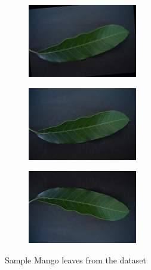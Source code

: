 \documentclass[twocolumn]{article}
\begin{document}
\begin{figure}[H]
    \begin{subfigure}[b]{0.30\columnwidth}
        \includegraphics[width=\textwidth]{mango7}
    \end{subfigure}
    \hfill
    \begin{subfigure}[b]{0.30\columnwidth}
        \includegraphics[width=\textwidth]{mango8}
    \end{subfigure}
    \hfill
    \begin{subfigure}[b]{0.30\columnwidth}
        \includegraphics[width=\textwidth]{mango9}
    \end{subfigure}
    \caption{Sample Mango leaves from the dataset}
    \label{fig:mango-samples}
\end{figure}
\end{document}
